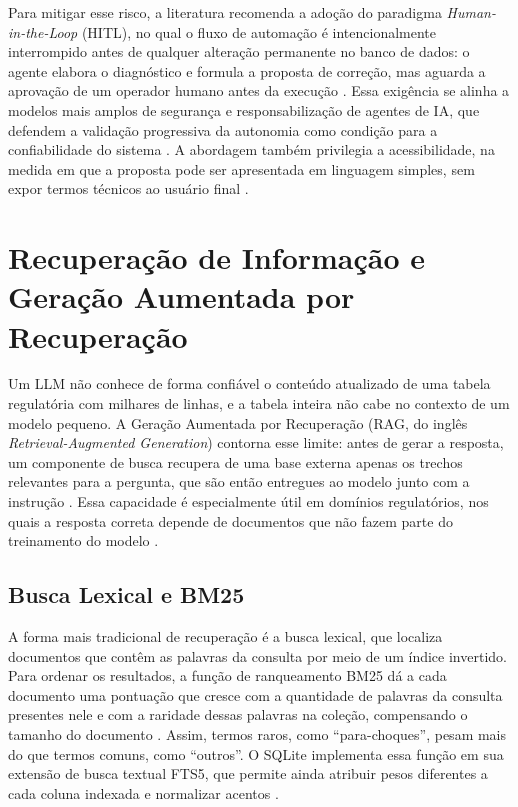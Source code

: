 Para mitigar esse risco, a literatura recomenda a adoção do paradigma \textit{Human-in-the-Loop} (HITL), no qual o fluxo de automação é intencionalmente interrompido antes de qualquer alteração permanente no banco de dados: o agente elabora o diagnóstico e formula a proposta de correção, mas aguarda a aprovação de um operador humano antes da execução \cite{Cheng2026DecoupledHITL}. Essa exigência se alinha a modelos mais amplos de segurança e responsabilização de agentes de IA, que defendem a validação progressiva da autonomia como condição para a confiabilidade do sistema \cite{cheng2025}. A abordagem também privilegia a acessibilidade, na medida em que a proposta pode ser apresentada em linguagem simples, sem expor termos técnicos ao usuário final \cite{Madicharla2025HITLllmops}.

\section{Recuperação de Informação e Geração Aumentada por Recuperação}
\label{sec:recuperacao}

Um LLM não conhece de forma confiável o conteúdo atualizado de uma tabela regulatória com milhares de linhas, e a tabela inteira não cabe no contexto de um modelo pequeno. A Geração Aumentada por Recuperação (RAG, do inglês \textit{Retrieval-Augmented Generation}) contorna esse limite: antes de gerar a resposta, um componente de busca recupera de uma base externa apenas os trechos relevantes para a pergunta, que são então entregues ao modelo junto com a instrução \cite{lewis2020rag}. Essa capacidade é especialmente útil em domínios regulatórios, nos quais a resposta correta depende de documentos que não fazem parte do treinamento do modelo \cite{kim2025qarag}.

\subsection{Busca Lexical e BM25}

A forma mais tradicional de recuperação é a busca lexical, que localiza documentos que contêm as palavras da consulta por meio de um índice invertido. Para ordenar os resultados, a função de ranqueamento BM25 dá a cada documento uma pontuação que cresce com a quantidade de palavras da consulta presentes nele e com a raridade dessas palavras na coleção, compensando o tamanho do documento \cite{robertson2009bm25}. Assim, termos raros, como ``para-choques'', pesam mais do que termos comuns, como ``outros''. O SQLite implementa essa função em sua extensão de busca textual FTS5, que permite ainda atribuir pesos diferentes a cada coluna indexada e normalizar acentos \cite{sqlite2024fts5}.

